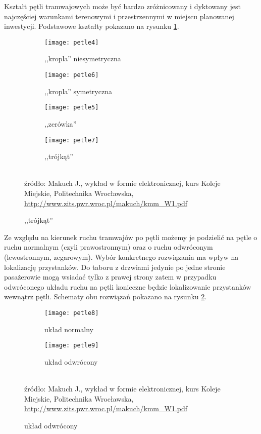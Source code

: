 \documentclass[twoside,12pt]{article}
\begin{document}
	Kształt pętli tramwajowych może być bardzo zróżnicowany i dyktowany jest najczęściej warunkami terenowymi i przestrzennymi w miejscu planowanej inwestycji. Podstawowe kształty pokazano na rysunku \ref{petle2}.
	
	\begin{figure}[H]
	\centering
	\caption{Podział pętli tramwajowych ze względu na kształt}
	\begin{subfigure}{.25\textwidth}
	  \centering
	  \caption{,,kropla'' niesymetryczna}
	  \texttt{[image: petle4]}
	\end{subfigure}%
	\begin{subfigure}{.25\textwidth}
	  \centering
	  \caption{,,kropla'' symetryczna}
	  \texttt{[image: petle6]}
	\end{subfigure}%
	\begin{subfigure}{.25\textwidth}
	  \centering
	  \caption{,,zerówka''}
	  \texttt{[image: petle5]}
	\end{subfigure}%
		\begin{subfigure}{.25\textwidth}
	  \centering
	  \caption{,,trójkąt''}
	  \texttt{[image: petle7]}
	\end{subfigure}
	\label{petle2}\\
	\footnotesize{źródło: Makuch J., wykład w formie elektronicznej, kurs Koleje Miejskie, Politechnika Wrocławska, \url{http://www.zits.pwr.wroc.pl/makuch/kmm_W1.pdf} \cite{makuch}}
	\end{figure}
	
	Ze względu na kierunek ruchu tramwajów po pętli możemy je podzielić na pętle o ruchu normalnym (czyli prawostronnym) oraz o ruchu odwróconym (lewostronnym, zegarowym). Wybór konkretnego rozwiązania ma wpływ na lokalizację przystanków. Do taboru z drzwiami jedynie po jedne stronie pasażerowie mogą wsiadać tylko z prawej strony zatem w przypadku odwróconego układu ruchu na pętli konieczne będzie lokalizowanie przystanków wewnątrz pętli. Schematy obu rozwiązań pokazano na rysunku \ref{petle3}.
	
	\begin{figure}[H]
	\centering
	\caption{Podział pętli tramwajowych ze względu na kierunek ruchu}
	\begin{subfigure}{.33\textwidth}
	  \centering
	  \caption{układ normalny}
	  \texttt{[image: petle8]}
	\end{subfigure}%
	\begin{subfigure}{.33\textwidth}
	  \centering
	  \caption{układ odwrócony}
	  \texttt{[image: petle9]}
	\end{subfigure}
	\label{petle3}\\
	\footnotesize{źródło: Makuch J., wykład w formie elektronicznej, kurs Koleje Miejskie, Politechnika Wrocławska, \url{http://www.zits.pwr.wroc.pl/makuch/kmm_W1.pdf} \cite{makuch}}
	\end{figure}
	
\end{document}
